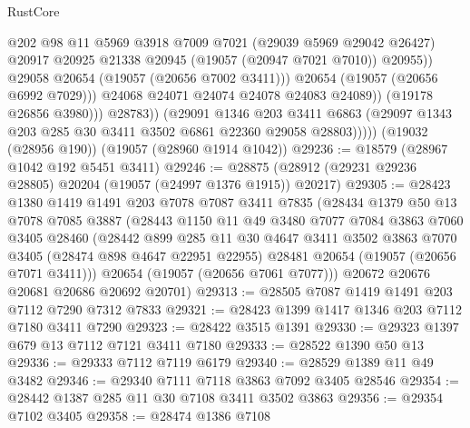 \begin{lexlean}{RustCore}
\begin{coremodule}
                              @202
                              @98
                              @11
                              @5969
                              @3918
                              @7009
                              @7021
                              (@29039 @5969 @29042 @26427)
                              @20917
                              @20925
                              @21338
                              @20945
                              (@19057 (@20947 @7021 @7010))
                              @20955))
                          @29058
                          @20654
                          (@19057 (@20656 @7002 @3411)))
                        @20654
                        (@19057 (@20656 @6992 @7029)))
                      @24068
                      @24071
                      @24074
                      @24078
                      @24083
                      @24089))
                  (@19178 @26856 @3980)))
              @28783))
          (@29091
            @1346
            @203
            @3411
            @6863
            (@29097 @1343 @203 @285 @30 @3411 @3502 @6861 @22360 @29058 @28803)))))
    (@19032 (@28956 @190))
    (@19057 (@28960 @1914 @1042))
@29236 := @18579 (@28967 @1042 @192 @5451 @3411)
@29246 := @28875 (@28912 (@29231 @29236 @28805) @20204 (@19057 (@24997 @1376 @1915)) @20217)
@29305 := @28423
    @1380
    @1419
    @1491
    @203
    @7078
    @7087
    @3411
    @7835
    (@28434
      @1379
      @50
      @13
      @7078
      @7085
      @3887
      (@28443
        @1150
        @11
        @49
        @3480
        @7077
        @7084
        @3863
        @7060
        @3405
        @28460
        (@28442
          @899
          @285
          @11
          @30
          @4647
          @3411
          @3502
          @3863
          @7070
          @3405
          (@28474 @898 @4647 @22951 @22955)
          @28481
          @20654
          (@19057 (@20656 @7071 @3411)))
        @20654
        (@19057 (@20656 @7061 @7077)))
      @20672
      @20676
      @20681
      @20686
      @20692
      @20701)
@29313 := @28505 @7087 @1419 @1491 @203 @7112 @7290 @7312 @7833
@29321 := @28423 @1399 @1417 @1346 @203 @7112 @7180 @3411 @7290
@29323 := @28422 @3515 @1391
@29330 := @29323 @1397 @679 @13 @7112 @7121 @3411 @7180
@29333 := @28522 @1390 @50 @13
@29336 := @29333 @7112 @7119 @6179
@29340 := @28529 @1389 @11 @49 @3482
@29346 := @29340 @7111 @7118 @3863 @7092 @3405 @28546
@29354 := @28442 @1387 @285 @11 @30 @7108 @3411 @3502 @3863
@29356 := @29354 @7102 @3405
@29358 := @28474 @1386 @7108

\end{coremodule}
\end{lexlean}
